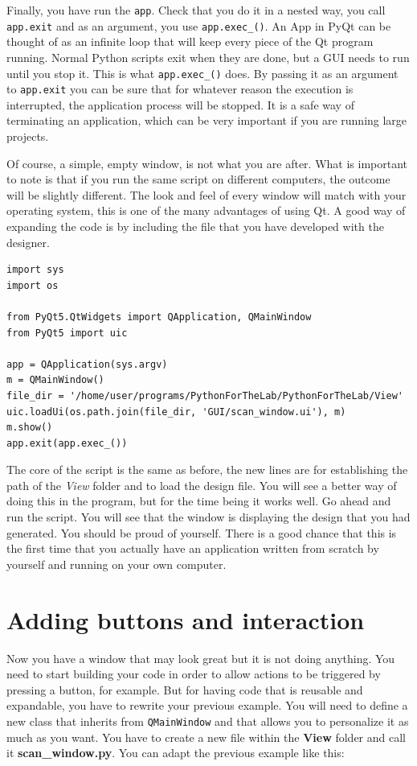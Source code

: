 Finally, you have run the \texttt{app}. Check that you do it in a nested
way, you call \texttt{app.exit} and as an argument, you use
\texttt{app.exec_()}. An App in PyQt can be thought of as an infinite
loop that will keep every piece of the Qt program running. Normal Python
scripts exit when they are done, but a {GUI} needs to run until you stop
it. This is what \texttt{app.exec_()} does. By passing it as an
argument to \texttt{app.exit} you can be sure that for whatever reason
the execution is interrupted, the application process will be stopped.
It is a safe way of terminating an application, which can be very
important if you are running large projects.

Of course, a simple, empty window, is not what you are after. What is
important to note is that if you run the same script on different
computers, the outcome will be slightly different. The look and feel of
every window will match with your operating system, this is one of the
many advantages of using Qt. A good way of expanding the code is by
including the file that you have developed with the designer.

\begin{verbatim}
import sys
import os

from PyQt5.QtWidgets import QApplication, QMainWindow
from PyQt5 import uic

app = QApplication(sys.argv)
m = QMainWindow()
file_dir = '/home/user/programs/PythonForTheLab/PythonForTheLab/View'
uic.loadUi(os.path.join(file_dir, 'GUI/scan_window.ui'), m)
m.show()
app.exit(app.exec_())
\end{verbatim}

The core of the script is the same as before, the new lines are for
establishing the path of the \emph{View} folder and to load the design
file. You will see a better way of doing this in the program, but for
the time being it works well. Go ahead and run the script. You will see
that the window is displaying the design that you had generated. You
should be proud of yourself. There is a good chance that this is the
first time that you actually have an application written from scratch by
yourself and running on your own computer.

\section{Adding buttons and interaction}\label{adding-buttons-andinteraction}
Now you have a window that may look great but it is not doing anything.
You need to start building your code in order to allow actions to be
triggered by pressing a button, for example. But for having code that
is reusable and expandable, you have to rewrite your previous example.
You will need to define a new class that inherits from
\texttt{QMainWindow} and that allows you to personalize it as much as
you want. You have to create a new file within the \textbf{View} folder
and call it \textbf{scan\_window.py}. You can adapt the previous example
like this:

